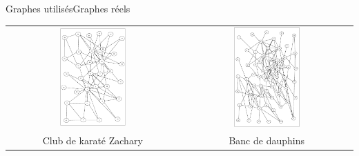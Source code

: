 \documentclass{beamer}
\begin{document}
\begin{frame}{Graphes utilisés}{Graphes réels}
	\begin{center}
		\begin{tabular}[h]{cc}
			\includegraphics[width=0.4\textwidth]{pres-za}&
			\includegraphics[width=0.4\textwidth]{pres-do}
			\\
			Club de karaté Zachary & Banc de dauphins
		\end{tabular}
	\end{center}
\end{frame}
\end{document}
